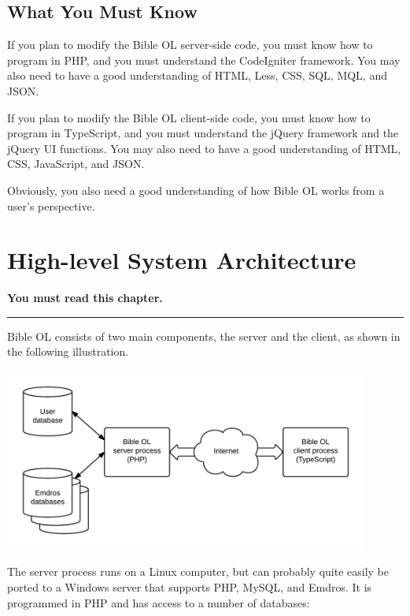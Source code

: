 \documentclass[11pt,oneside,a4paper]{memoir}
\begin{document}
\section{What You Must Know}

If you plan to modify the Bible OL server-side code, you must know how to program in PHP, and you
must understand the CodeIgniter framework. You may also need to have a good understanding of HTML,
Less, CSS, SQL, MQL, and JSON.

If you plan to modify the Bible OL client-side code, you must know how to program in TypeScript, and
you must understand the jQuery framework and the jQuery UI functions. You may also need to have a
good understanding of HTML, CSS, JavaScript, and JSON.

Obviously, you also need a good understanding of how Bible OL works from a user's perspective.

\chapter{High-level System Architecture}

\textbf{You must read this chapter.}

\plainbreak{3}

Bible OL consists of two main components, the server and the client, as shown in the following illustration.

\begin{center}
  \includegraphics[width=0.9\textwidth]{BOL_overview.png}
\end{center}

The server process runs on a Linux computer, but can probably quite easily be ported to a Windows server
that supports PHP, MySQL, and Emdros. It is programmed in PHP and has access to a number of
databases:
\end{document}
